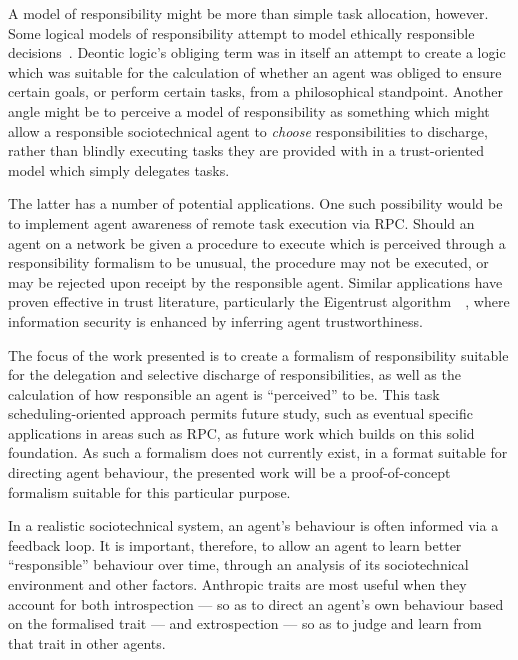 A model of responsibility might be more than simple task allocation, however. Some logical models of responsibility attempt to model ethically responsible decisions~\cite{berreby2015modelling}. Deontic logic's obliging term was in itself an attempt to create a logic which was suitable for the calculation of whether an agent was obliged to ensure certain goals, or perform certain tasks, from a philosophical standpoint. Another angle might be to perceive a model of responsibility as something which might allow a responsible sociotechnical agent to \emph{choose} responsibilities to discharge, rather than blindly executing tasks they are provided with in a trust-oriented model which simply delegates tasks.\par

The latter has a number of potential applications. One such possibility would be to implement agent awareness of remote task execution via RPC\@. Should an agent on a network be given a procedure to execute which is perceived through a responsibility formalism to be unusual, the procedure may not be executed, or may be rejected upon receipt by the responsible agent. Similar applications have proven effective in trust literature, particularly the Eigentrust algorithm~\cite{eigentrust}~, where information security is enhanced by inferring agent trustworthiness.\par

The focus of the work presented is to create a formalism of responsibility suitable for the delegation and selective discharge of responsibilities, as well as the calculation of how responsible an agent is ``perceived'' to be. This task scheduling-oriented approach permits future study, such as eventual specific applications in areas such as RPC, as future work which builds on this solid foundation. As such a formalism does not currently exist, in a format suitable for directing agent behaviour, the presented work will be a proof-of-concept formalism suitable for this particular purpose.\par

In a realistic sociotechnical system, an agent's behaviour is often informed via a feedback loop. It is important, therefore, to allow an agent to learn better ``responsible'' behaviour over time, through an analysis of its sociotechnical environment and other factors. Anthropic traits are most useful when they account for both introspection --- so as to direct an agent's own behaviour based on the formalised trait --- and extrospection --- so as to judge and learn from that trait in other agents.\par

